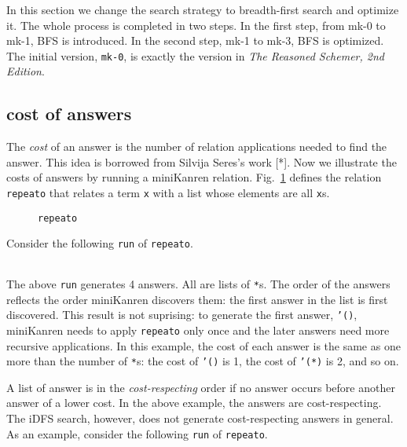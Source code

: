 \documentclass[format=acmlarge, review=true, authordraft=true]{acmart}
\begin{document}
In this section we change the search strategy to breadth-first search and optimize it. The whole process is completed in two steps. In the first step, from mk-0 to mk-1, BFS is introduced. In the second step, mk-1 to mk-3, BFS is optimized. The initial version, \texttt{mk-0}, is exactly the version in \emph{The Reasoned Schemer, 2nd Edition}.



\subsection{cost of answers}


The \emph{cost} of an answer is the number of relation applications needed to
find the answer. This idea is borrowed from Silvija Seres's work [*].
Now we illustrate the costs of answers by running a miniKanren relation.
Fig.~\ref{def-repeato} defines the relation \texttt{repeato} that 
relates a term \texttt{x} with a list whose elements are all \texttt{x}s.

\begin{figure}
  
  \caption{\texttt{repeato}}
  \label{def-repeato}
\end{figure}

Consider the following \texttt{run} of \texttt{repeato}.
\begin{center}
  \begin{tabular}{c}
  
   \end{tabular}
\end{center}

The above \texttt{run} generates 4 answers. All are lists of \texttt{*}s.
The order of the answers reflects the order miniKanren discovers them:
the first answer in the list is first discovered. This result is not suprising:
to generate the first answer, \texttt{'()}, miniKanren needs to apply
\texttt{repeato} only once and the later answers need more recursive
applications. In this example, the cost of each answer is the same as
one more than the number of \texttt{*}s: the cost of \texttt{'()} is 1,
the cost of \texttt{'(*)} is 2, and so on.

A list of answer is in the \emph{cost-respecting} order if no answer occurs
before another answer of a lower cost. In the above example, the answers are
cost-respecting. The iDFS search, however, does not generate cost-respecting
answers in general. As an example, consider the following \texttt{run} of
\texttt{repeato}.
\begin{center}
  \begin{tabular}{c}
   
   \end{tabular}
\end{center}
\end{document}
